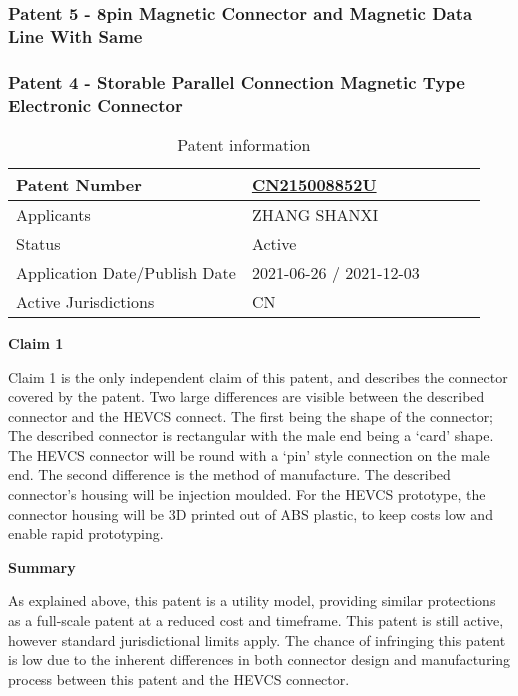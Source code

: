 \documentclass [12pt]{article}
\begin{document}
\subsubsection{Patent 5 - 8pin Magnetic Connector and Magnetic Data Line With Same}
\subsubsection{Patent 4 - Storable Parallel Connection Magnetic Type Electronic Connector}
\begin{table}[H]
    \centering
    \setlength{\arrayrulewidth}{1.5pt}
    \begin{tabular}{|p{0.5\linewidth}|p{0.5\linewidth}|}
    \hline
    Patent Number & \href{https://worldwide.espacenet.com/patent/search/family/079083033/publication/CN215008852U?q=CN215008852U}{CN215008852U}\\
    \hline
    Applicants &ZHANG SHANXI\\
    \hline
    Status & Active\\
    \hline
    Application Date/Publish Date & 2021-06-26 / 2021-12-03\\
    \hline
    Active Jurisdictions & CN\\
    \hline
    \end{tabular}
    \caption{Patent information}
    \label{table:mag_con5}
\end{table}
\textbf{Claim 1}

Claim 1 is the only independent claim of this patent, and describes the connector covered by the patent. Two large differences are visible between the described connector and the HEVCS connect. The first being the shape of the connector; The described connector is rectangular with the male end being a ‘card’ shape. The HEVCS connector will be round with a ‘pin’ style connection on the male end.
The second difference is the method of manufacture. The described connector’s housing will be injection moulded. For the HEVCS prototype, the connector housing will be 3D printed out of ABS plastic, to keep costs low and enable rapid prototyping. 

\textbf{Summary}

As explained above, this patent is a utility model, providing similar protections as a full-scale patent at a reduced cost and timeframe. This patent is still active, however standard jurisdictional limits apply. The chance of infringing this patent is low due to the inherent differences in both connector design and manufacturing process between this patent and the HEVCS connector.
\end{document}
